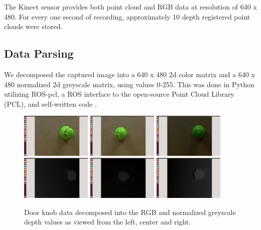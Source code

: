 \documentclass{article}
\begin{document}
The Kinect sensor provides both point cloud and RGB data at resolution of 640 x 480. For every one second of recording, approximately 10 depth registered point clouds were stored.

\subsection{Data Parsing}
We decomposed the captured image into a 640 x 480 2d color matrix and a 640 x 480 normalized 2d greyscale matrix, using values 0-255. This was done in Python utilizing ROS-pcl, a ROS interface to the open-source Point Cloud Library (PCL), and self-written code \cite{pcl, rospcl}.

\begin{figure}
    \centering
    \includegraphics[width=0.3\textwidth]{DH_RGB_L.png}
    \includegraphics[width=0.3\textwidth]{DH_RGB_C.png}
    \includegraphics[width=0.3\textwidth]{DH_RGB_R.png}
    \includegraphics[width=0.3\textwidth]{DH_D_L.png}
    \includegraphics[width=0.3\textwidth]{DH_D_C.png}
    \includegraphics[width=0.3\textwidth]{DH_D_R.png}
    \caption{Door knob data decomposed into the RGB and normalized greyscale depth values as viewed from the left, center and right.}
    \label{fig:decomposition}
\end{figure}
\end{document}
